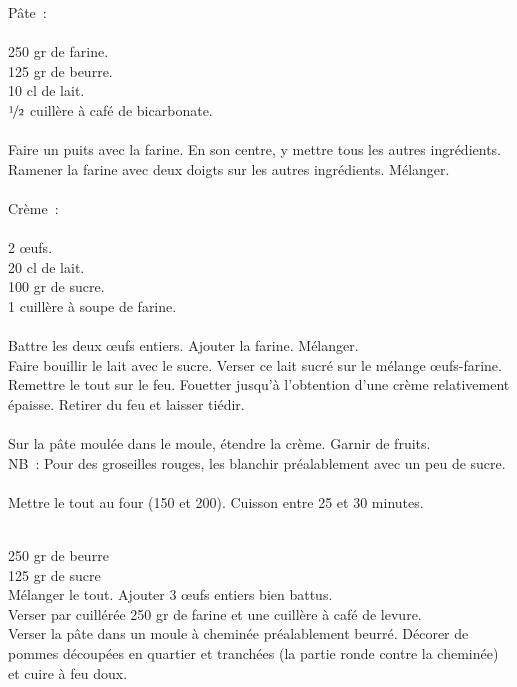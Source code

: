 \begin{minipage}[c]{\textwidth}
Pâte :\\
\\
250 gr de farine.\\
125 gr de beurre.\\
10 cl de lait.\\
$\nicefrac{1}{2}$ cuillère à café de bicarbonate.\\
\\
Faire un puits avec la farine. En son centre, y mettre tous les autres ingrédients. Ramener la farine avec deux doigts sur les autres ingrédients. Mélanger. \\
\\
Crème :\\
\\
2 œufs.\\
20 cl de lait.\\
100 gr de sucre.\\
1 cuillère à soupe de farine.\\
\\
Battre les deux œufs entiers. Ajouter la farine. Mélanger.\\
Faire bouillir le lait avec le sucre. Verser ce lait sucré sur le mélange œufs-farine.\\
Remettre le tout sur le feu. Fouetter jusqu’à l’obtention d’une crème relativement épaisse. Retirer du feu et laisser tiédir.\\
\\
Sur la pâte moulée dans le moule, étendre la crème. Garnir de fruits. \\
NB : Pour des groseilles rouges, les blanchir préalablement avec un peu de sucre.\\
\\
Mettre le tout au four (150 et 200\degrees). Cuisson entre 25 et 30 minutes.\\
\\

\end{minipage}

\begin{minipage}[c]{\textwidth}
250 gr de beurre\\
125 gr de sucre\\
Mélanger le tout. Ajouter 3 œufs entiers bien battus. \\
Verser par cuillérée 250 gr de farine et une cuillère à café de levure.\\
Verser la pâte dans un moule à cheminée préalablement beurré. Décorer de pommes découpées en quartier et tranchées (la partie ronde contre la cheminée) et cuire à feu doux.\\
\\

\end{minipage}

